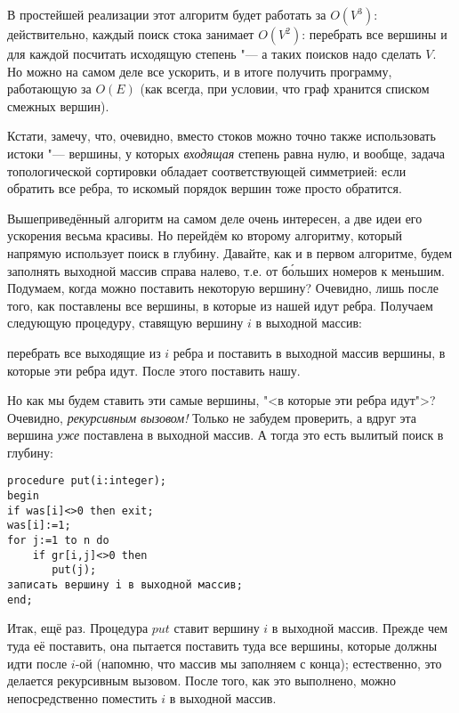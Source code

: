 В простейшей реализации этот алгоритм будет работать за $O(V^3)$: действительно, каждый поиск стока 
занимает $O(V^2)$: перебрать все вершины и для каждой посчитать исходящую степень "--- а таких 
поисков надо сделать $V$. Но можно на самом деле все ускорить, и в итоге получить программу, 
работающую за $O(E)$ (как всегда, при условии, что граф хранится списком смежных вершин).


Кстати, замечу, что, очевидно, вместо стоков можно точно также использовать истоки "--- вершины, у 
которых \textit{входящая} степень равна нулю, и вообще, задача топологической сортировки обладает 
соответствующей симметрией: если обратить все ребра, то искомый порядок вершин тоже просто 
обратится.

Вышеприведённый алгоритм на самом деле очень интересен, а две идеи его ускорения весьма красивы. Но 
перейдём ко второму алгоритму, который напрямую использует поиск в глубину. Давайте, как и в первом 
алгоритме, будем заполнять выходной массив справа налево, т.е. от б\'{о}льших номеров к меньшим. 
Подумаем, когда можно поставить некоторую вершину? Очевидно, лишь после того, как поставлены все 
вершины, в которые из нашей идут ребра. Получаем следующую процедуру, ставящую вершину $i$ в 
выходной массив: 
\begin{center}
перебрать все выходящие из $i$ ребра и поставить в выходной массив вершины, в 
которые эти ребра идут. После этого поставить нашу. 
\end{center}
Но как мы будем ставить эти самые вершины, "<в которые эти ребра идут">? Очевидно, 
\textit{рекурсивным вызовом!} Только не забудем проверить, а вдруг эта вершина \textit{уже} поставлена в 
выходной массив. А тогда это есть вылитый поиск в глубину:
\begin{codesampleo}\begin{verbatim}
procedure put(i:integer);
begin
if was[i]<>0 then exit;
was[i]:=1;
for j:=1 to n do
    if gr[i,j]<>0 then
       put(j);
записать вершину i в выходной массив;
end;
\end{verbatim}\end{codesampleo}
Итак, ещё раз. Процедура $put$ ставит вершину $i$ в выходной массив. Прежде чем туда её поставить, 
она пытается поставить туда все вершины, которые должны идти после $i$-ой (напомню, что массив мы 
заполняем с конца); естественно, это делается рекурсивным вызовом. После того, как это выполнено, 
можно непосредственно поместить $i$ в выходной массив.


